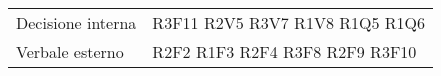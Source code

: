 \begin{center}
\begin{longtable}{C{6cm} C{6cm}}
Decisione interna & R3F11 \newline
					R2V5 \newline
					R3V7 \newline
					R1V8 \newline
					R1Q5 \newline
					R1Q6 \\

Verbale esterno & 	R2F2 \newline
					R1F3 \newline
					R2F4 \newline
					R3F8 \newline
					R2F9 \newline
					R3F10 \\

\end{longtable}
\end{center}